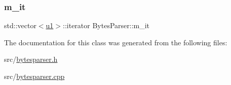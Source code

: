 \subsubsection{\texorpdfstring{m\+\_\+it}{m\_it}}
{\footnotesize\ttfamily std\+::vector$<$\hyperlink{types_8h_a162f47a77ee24f6f77cd8c82ccd40ab7}{u1}$>$\+::iterator Bytes\+Parser\+::m\+\_\+it\hspace{0.3cm}{\ttfamily [private]}}



The documentation for this class was generated from the following files\+:\begin{DoxyCompactItemize}
\item 
src/\hyperlink{bytesparser_8h}{bytesparser.\+h}\item 
src/\hyperlink{bytesparser_8cpp}{bytesparser.\+cpp}\end{DoxyCompactItemize}

